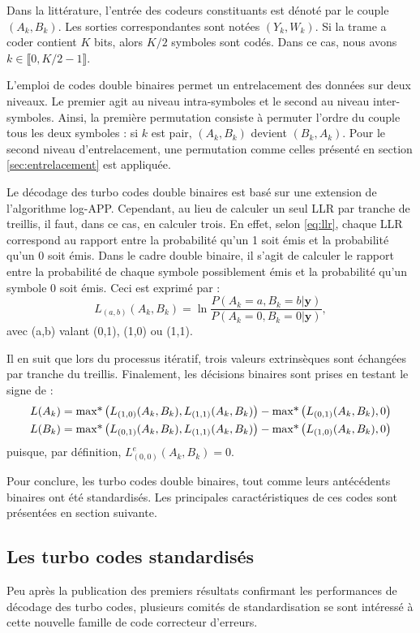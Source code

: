 Dans la littérature, l'entrée des codeurs constituants est dénoté par le couple $(A_k,B_k)$. Les sorties correspondantes 
sont notées $(Y_k,W_k)$. Si la trame a coder contient $K$ bits, alors $K/2$ symboles sont codés. Dans ce cas, nous avons 
$k \in \llbracket 0, K/2-1\rrbracket$.

L'emploi de codes double binaires permet un entrelacement des données sur deux niveaux. Le premier agit au niveau 
intra-symboles et le second au niveau inter-symboles. Ainsi, la première permutation consiste à permuter l'ordre du 
couple tous les deux symboles : si $k$ est pair, $(A_k,B_k)$ devient $(B_k,A_k)$. Pour le second niveau d'entrelacement, 
une permutation comme celles présenté en section \ref{sec:entrelacement} est appliquée.

Le décodage des turbo codes double binaires est basé sur une extension de l'algorithme log-APP. Cependant, au lieu de 
calculer un seul LLR par tranche de treillis, il faut, dans ce cas, en calculer trois. En effet, selon \ref{eq:llr}, 
chaque LLR correspond au rapport entre la probabilité qu'un 1 soit émis et la probabilité qu'un 0 soit émis. Dans le 
cadre double binaire, il s'agit de calculer le rapport entre la probabilité de chaque symbole possiblement émis et la 
probabilité qu'un symbole 0 soit émis. Ceci est exprimé par : 
\begin{equation*}
	L_{(a,b)}(A_k,B_k) = \ln\frac{P(A_k=a,B_k=b|\mathbf{y})}{P(A_k=0,B_k=0|\mathbf{y})},
\end{equation*}
avec (a,b) valant (0,1), (1,0) ou (1,1).

Il en suit que lors du processus itératif, trois valeurs extrinsèques sont échangées par tranche du treillis.
Finalement, les décisions binaires sont prises en testant le signe de : 
\begin{align*}
	L(A_k) & = \operatorname*{max*} \left(L_{(1,0)}(A_k,B_k),L_{(1,1)}(A_k,B_k)\right) - \operatorname*{max*} \left(L_{(0,1)}(A_k,B_k),0\right) \\
	L(B_k) & = \operatorname*{max*} \left(L_{(0,1)}(A_k,B_k),L_{(1,1)}(A_k,B_k)\right) - \operatorname*{max*} \left(L_{(1,0)}(A_k,B_k),0\right) 
\end{align*}
puisque, par définition, $L^e_{(0,0)}(A_k,B_k)=0$.

Pour conclure, les turbo codes double binaires, tout comme leurs antécédents binaires ont été standardisés. Les 
principales caractéristiques de ces codes sont présentées en section suivante.

\subsection{Les turbo codes standardisés}
Peu après la publication des premiers résultats confirmant les performances de décodage des turbo codes, plusieurs 
comités de standardisation se sont intéressé à cette nouvelle famille de code correcteur d'erreurs.

